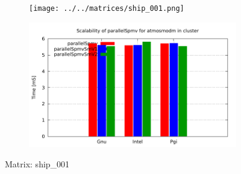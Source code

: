 \begin{figure} [ht!]
    \centering
    \captionsetup{justification=centering, singlelinecheck=false}
    \begin{subfigure}{.65\textwidth}
      \centering
      \hspace*{-3.5cm} 
      \texttt{[image: ../../matrices/ship\_001.png]}
      \label{fig:ship_001_matrix}
    \end{subfigure}%
    \begin{subfigure}{.65\textwidth}
      \centering
      \hspace*{-6.0cm} 
      \includegraphics[page=6, width=0.95\linewidth]{../plots/myCluster_4-2.pdf}
      \label{fig:ship_001_performance}
    \end{subfigure}
\caption{Matrix: ship\_001}
\label{fig:ship_001}
\end{figure}

